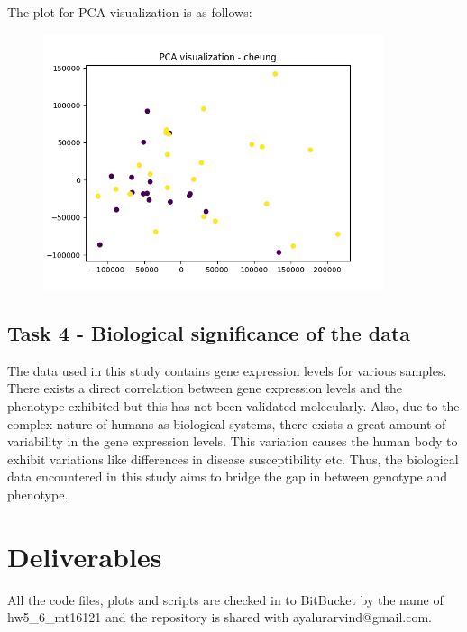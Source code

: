 \documentclass[11pt]{article}
\begin{document}
The plot for PCA visualization is as follows:
\begin{figure}[H]
\includegraphics[width=10cm]{PCA_Visualization.png}
\end{figure}

\subsection{Task 4 - Biological significance of the data}
The data used in this study contains gene expression levels for various samples. There exists a direct correlation between gene expression levels and the phenotype exhibited but this has not been validated molecularly. Also, due to the complex nature of humans as biological systems, there exists a great amount of variability in the gene expression levels. This variation causes the human body to exhibit variations like differences in disease susceptibility etc. Thus, the biological data encountered in this study aims to bridge the gap in between genotype and phenotype. 

\section{Deliverables}
All the code files, plots and scripts are checked in to BitBucket by the name of hw5\_6\_mt16121 and the repository is shared with ayalurarvind@gmail.com.



\end{document}
